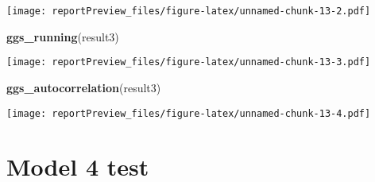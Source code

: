 \documentclass[]{article}
\newenvironment{Shaded}{\begin{snugshade}}{\end{snugshade}}
\newcommand{\KeywordTok}[1]{\textcolor[rgb]{0.13,0.29,0.53}{\textbf{#1}}}
\newcommand{\NormalTok}[1]{#1}
\begin{document}
\texttt{[image: reportPreview\_files/figure-latex/unnamed-chunk-13-2.pdf]}

\begin{Shaded}
\begin{Highlighting}[]
\KeywordTok{ggs_running}\NormalTok{(result3)}
\end{Highlighting}
\end{Shaded}

\texttt{[image: reportPreview\_files/figure-latex/unnamed-chunk-13-3.pdf]}

\begin{Shaded}
\begin{Highlighting}[]
\KeywordTok{ggs_autocorrelation}\NormalTok{(result3)}
\end{Highlighting}
\end{Shaded}

\texttt{[image: reportPreview\_files/figure-latex/unnamed-chunk-13-4.pdf]}

\section{Model 4 test}\label{model-4-test}
\end{document}
